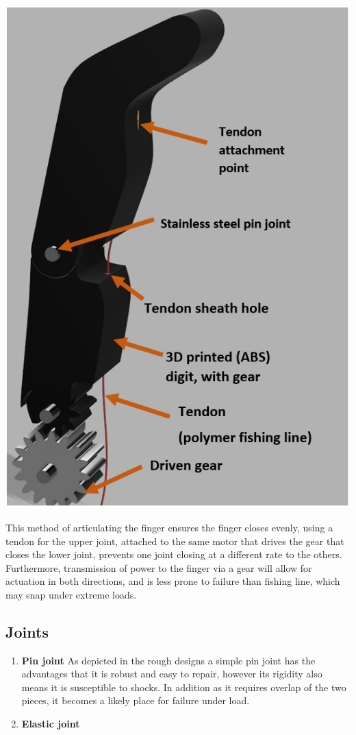 \documentclass[11pt,3p]{report}
\begin{document}
\begin{multicols}{2}
\begin{enumerate}[noitemsep]
{				\includegraphics[scale=0.45]{gear.PNG}
				
				This method of articulating the finger ensures the finger closes evenly, using a tendon for the upper joint, attached to the same motor that drives the gear that closes the lower joint, prevents one joint closing at a different rate to the others. Furthermore, transmission of power to the finger via a gear will allow for actuation in both directions, and is less prone to failure than fishing line, which may snap under extreme loads.
			}		
			\end{enumerate}
			
		\subsection{Joints}

 \begin{enumerate}[noitemsep]
        \item \textbf{Pin joint} {
        As depicted in the rough designs a simple pin joint has the advantages that it is robust and easy to repair, however its rigidity also means it is susceptible to shocks. In addition as it requires overlap of the two pieces, it becomes a likely place for failure under load.
        }
        \vfill\null
			\columnbreak
        \item \textbf{Elastic joint} {
        
}
\end{enumerate}
\end{multicols}
\end{document}
